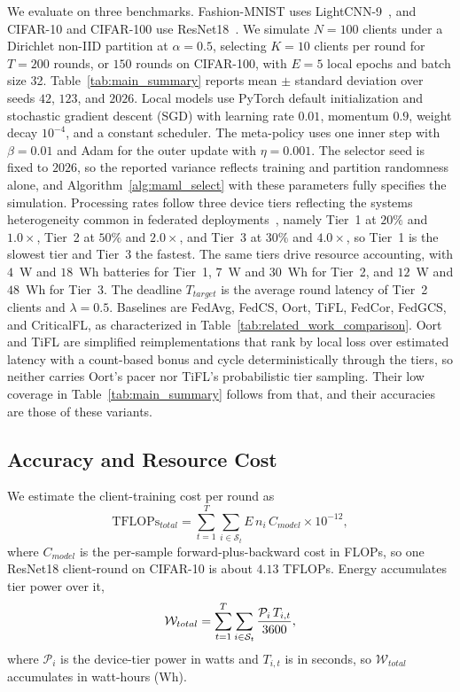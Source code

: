 \documentclass[journal]{IEEEtran}
\theoremstyle{remark}
\newcommand{\revision}[1]{#1}
\newcommand{\revtwo}[1]{#1}
\begin{document}
\revision{We evaluate on three benchmarks. Fashion-MNIST uses LightCNN-9~\cite{wu2018light}, and CIFAR-10 and CIFAR-100 use ResNet18~\cite{he2016deep}.} \revision{We simulate $N = 100$ clients under a Dirichlet non-IID partition at $\alpha = 0.5$, selecting $K = 10$ clients per round for $T = 200$ rounds, or $150$ rounds on CIFAR-100, with $E = 5$ local epochs and batch size 32. Table~\ref{tab:main_summary} reports mean $\pm$ standard deviation over seeds $42$, $123$, and $2026$. Local models use PyTorch default initialization and stochastic gradient descent (SGD) with learning rate $0.01$, momentum $0.9$, weight decay $10^{-4}$, and a constant scheduler. The meta-policy uses one inner step with $\beta=0.01$ and Adam for the outer update with $\eta=0.001$. The selector seed is fixed to $2026$, so the reported variance reflects training and partition randomness alone, and Algorithm~\ref{alg:maml_select} with these parameters fully specifies the simulation. Processing rates follow three device tiers reflecting the systems heterogeneity common in federated deployments~\cite{li2020federated}, namely Tier~1 at $20\%$ and $1.0\times$, Tier~2 at $50\%$ and $2.0\times$, and Tier~3 at $30\%$ and $4.0\times$, so Tier~1 is the slowest tier and Tier~3 the fastest. The same tiers drive resource accounting, with $4$~W and $18$~Wh batteries for Tier~1, $7$~W and $30$~Wh for Tier~2, and $12$~W and $48$~Wh for Tier~3.} {\color{black}The deadline $T_{target}$ is the average round latency of Tier~2 clients and $\lambda = 0.5$. \revision{Baselines are FedAvg, FedCS, Oort, TiFL, FedCor, FedGCS, and CriticalFL, as characterized in Table~\ref{tab:related_work_comparison}.} \revtwo{Oort and TiFL are simplified reimplementations that rank by local loss over estimated latency with a count-based bonus and cycle deterministically through the tiers, so neither carries Oort's pacer nor TiFL's probabilistic tier sampling. Their low coverage in Table~\ref{tab:main_summary} follows from that, and their accuracies are those of these variants.}}

\subsection{\revision{Accuracy and Resource Cost}}
\revision{We estimate the client-training cost per round as}
\begin{equation}
	\text{TFLOPs}_{total} = \sum_{t=1}^{T} \sum_{i \in \mathcal{S}_t} E\, n_i\, C_{model} \times 10^{-12},
	\label{eq:tflops}
\end{equation}
\revision{where $C_{model}$ is the per-sample forward-plus-backward cost in FLOPs, so one ResNet18 client-round on CIFAR-10 is about $4.13$ TFLOPs.} \revtwo{Energy accumulates tier power over it,}
\begin{equation}
\color{black}
\mathcal{W}_{total}=\sum_{t=1}^{T}\sum_{i\in\mathcal{S}_t} \frac{\mathcal{P}_i\,T_{i,t}}{3600},
\label{eq:energy}
\end{equation}
\revision{where $\mathcal{P}_i$ is the device-tier power in watts and $T_{i,t}$ is in seconds, so $\mathcal{W}_{total}$ accumulates in watt-hours (Wh).}
\end{document}
